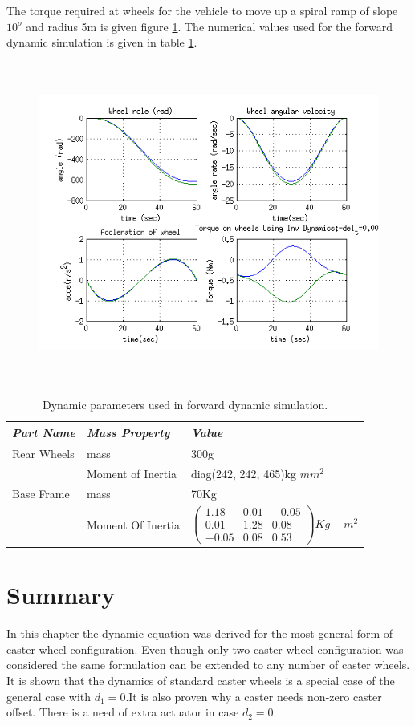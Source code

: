 The torque required at wheels for the vehicle to  move up a spiral ramp  of slope $10^o$ and radius 5m is given figure \ref{fig:spiral}. The numerical values used for the forward dynamic simulation is given in table \ref{tb:massproperty}.
 \begin{figure}
	\includegraphics[height=300pt,keepaspectratio]{Chapter4/fig/FD}
	\label{fig:spiral} 
\end{figure} 
%
\begin{table}[!htbp]
	\caption{Dynamic parameters used in forward dynamic simulation.}
	\label{tb:massproperty}
	\centering
	\begin{tabular}{l l l}
		\hline
		\emph{Part Name}  & \emph{Mass Property} & \emph{Value} \\
		\hline
		Rear Wheels  & mass &300g \\ 
		 & Moment of Inertia & diag(242, 242, 465)kg $mm^2$\\
		Base Frame & mass & 70Kg \\
		 & Moment Of Inertia & $ \begin{pmatrix}
		 1.18& 0.01&-0.05\\ 0.01 & 1.28 & 0.08\\
		 -0.05 & 0.08 & 0.53
		 \end{pmatrix} Kg-m^2$ \\
		\hline
	\end{tabular}
\end{table}
 
\section{Summary}
In this chapter the dynamic equation was derived for  the most general form of caster wheel configuration. Even though  only two caster wheel configuration was considered the same formulation can be extended to any number of caster wheels. It is shown that the  dynamics of standard caster wheels is a special case of the  general case with $d_1=0$.It is also proven why a caster needs  non-zero caster offset. There is a  need of extra actuator in case $d_2=0$.
    




